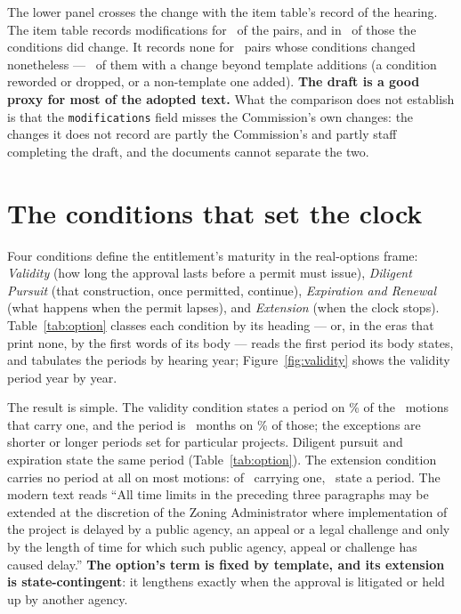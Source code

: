 \documentclass[11pt]{article}
\newcommand{\cctable}[1]{\FloatBarrier\def\cctab{#1}}
\begin{document}
The lower panel crosses the change with the item table's record of the hearing. The item
table records modifications for \ccDiffMods\ of the pairs, and in \ccDiffModsChange\ of those
the conditions did change. It records none for \ccDiffNoModsChange\ pairs whose conditions
changed nonetheless --- \ccDiffNoModsBeyond\ of them with a change beyond template additions
(a condition reworded or dropped, or a non-template one added). \textbf{The draft is a good
proxy for most of the adopted text.} What the comparison does not establish is that the
\texttt{modifications} field misses the Commission's own changes: the changes it does not record
are partly the Commission's and partly staff completing the draft, and the documents cannot
separate the two.

\cctable{diff}
\cctable{added}

\section{The conditions that set the clock}
\label{sec:option}

Four conditions define the entitlement's maturity in the real-options frame: \emph{Validity}
(how long the approval lasts before a permit must issue), \emph{Diligent Pursuit} (that
construction, once permitted, continue), \emph{Expiration and Renewal} (what happens when the
permit lapses), and \emph{Extension} (when the clock stops). Table~\ref{tab:option} classes
each condition by its heading --- or, in the eras that print none, by the first words of its
body --- reads the first period its body states, and tabulates the periods by hearing year;
Figure~\ref{fig:validity} shows the validity period year by year.

The result is simple. The validity condition states a period on \ccValidityStatePct\% of the \ccValidityN\
motions that carry one, and the period is \ccValidityModal\ months on \ccValidityModalShare\%
of those; the exceptions are shorter or longer periods set for particular projects. Diligent
pursuit and expiration state the same period (Table~\ref{tab:option}). The extension condition carries no
period at all on most motions: of \ccExtensionN\ carrying one, \ccExtensionWithPeriod\ state
a period. The modern text reads ``All time limits in the preceding three paragraphs may be
extended at the discretion of the Zoning Administrator where implementation of the project is
delayed by a public agency, an appeal or a legal challenge and only by the length of time for
which such public agency, appeal or challenge has caused delay.'' \textbf{The option's term is
fixed by template, and its extension is state-contingent}: it lengthens exactly when the
approval is litigated or held up by another agency.
\end{document}
